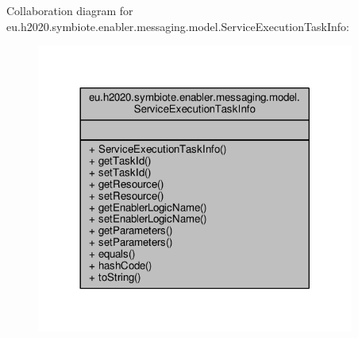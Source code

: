 Collaboration diagram for eu.\+h2020.\+symbiote.\+enabler.\+messaging.\+model.\+Service\+Execution\+Task\+Info\+:\nopagebreak
\begin{figure}[H]
\begin{center}
\leavevmode
\includegraphics[width=296pt]{classeu_1_1h2020_1_1symbiote_1_1enabler_1_1messaging_1_1model_1_1ServiceExecutionTaskInfo__coll__graph}
\end{center}
\end{figure}
